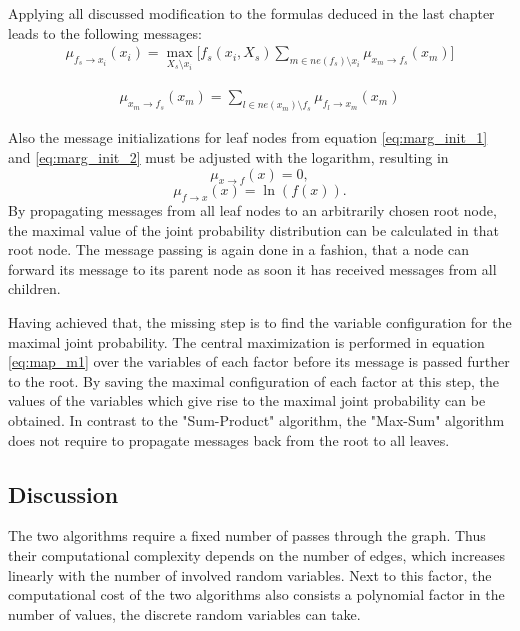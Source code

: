 \documentclass{sigkdd}
\begin{document}
Applying all discussed modification to the formulas deduced in the last chapter leads to the following messages:
\begin{equation}\label{eq:map_m1}
\begin{split}
\mu_{f_s \rightarrow x_i}(x_i) = \max_{X_s \setminus x_i} \Big[f_s(x_i, X_s) \sum_{m \in ne(f_s) \setminus x_i} \mu_{x_m \rightarrow f_s}(x_m) \Big]
\end{split}
\end{equation}

\begin{equation}\label{eq:map_m2}
\begin{split}
\mu_{x_m \rightarrow f_s}(x_m) = \sum_{l \in ne(x_m) \setminus f_s} \mu_{f_l \rightarrow x_m}(x_m)
\end{split}
\end{equation}

Also the message initializations for leaf nodes from equation \ref{eq:marg_init_1} and \ref{eq:marg_init_2} must be adjusted with the logarithm, resulting in
\begin{equation}\label{eq:marg_init2_1}
\mu_{x \rightarrow f}(x) = 0,
\end{equation}
\begin{equation}\label{eq:marg_init2_2}
\mu_{f \rightarrow x}(x) = \ln(f(x)).
\end{equation}
By propagating messages from all leaf nodes to an arbitrarily chosen root node, the maximal value of the joint probability distribution can be calculated in that root node. The message passing is again done in a fashion, that a node can forward its message to its parent node as soon it has received messages from all children.

Having achieved that, the missing step is to find the variable configuration for the maximal joint probability. The central maximization is performed in equation \ref{eq:map_m1} over the variables of each factor before its message is passed further to the root. By saving the maximal configuration of each factor at this step, the values of the variables which give rise to the maximal joint probability can be obtained. In contrast to the "Sum-Product" algorithm, the "Max-Sum" algorithm does not require to propagate messages back from the root to all leaves.

\subsection{Discussion}
The two algorithms require a fixed number of passes through the graph. Thus their computational complexity depends on the number of edges, which increases linearly with the number of involved random variables. Next to this factor, the computational cost of the two algorithms also consists a polynomial factor in the number of values, the discrete random variables can take.
\end{document}
